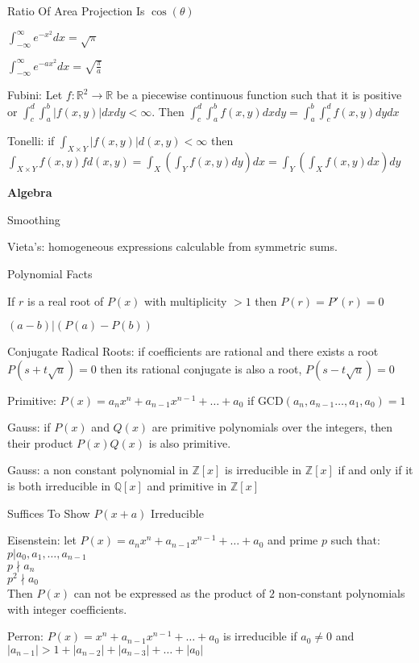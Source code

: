 Ratio Of Area Projection Is $\cos(\theta)$

$\int_{-\infty}^{\infty} e^{-x^2} dx = \sqrt{\pi}$

$\int_{-\infty}^{\infty} e^{-ax^2} dx = \sqrt{\frac{\pi}{a}}$

Fubini: Let $f: \mathbb{R}^2 \to \mathbb{R}$ be a piecewise continuous function such that it is positive or $\int_c^d \int_a^b |f(x,y)| dx dy < \infty$. Then $\int_c^d \int_a^b f(x,y) dx dy = \int_a^b \int_c^d f(x,y) dy dx$

Tonelli: if $\int_{X \times Y} |f(x,y)| d(x,y) < \infty$ then \\
$\int_{X \times Y} f(x,y)f d(x,y) = \int_{X}\left(\int_{Y} f(x,y) dy \right) dx = \int_{Y}\left(\int_{X} f(x,y) dx \right) dy$

\newpage

\textbf{Algebra}

Smoothing

Vieta's: homogeneous expressions calculable from symmetric sums.

Polynomial Facts

If $r$ is a real root of $P(x)$ with multiplicity $>1$ then $P(r)=P'(r)=0$

$(a-b)|(P(a)-P(b))$

Conjugate Radical Roots: if coefficients are rational and there exists a root $P(s+t\sqrt{u})=0$ then its rational conjugate is also a root, $P(s-t\sqrt{u})=0$

Primitive: $P(x)=a_n x^n+a_{n-1}x^{n-1}+\dots +a_0$ if $\text{GCD}(a_n,a_{n-1}\dots,a_1,a_0)=1$

Gauss: if $P(x)$ and $Q(x)$ are primitive polynomials over the integers, then their product $P(x)Q(x)$ is also primitive.

Gauss: a non constant polynomial in $\mathbb{Z}[x]$ is irreducible in $\mathbb{Z}[x]$ if and only if it is both irreducible in $\mathbb{Q}[x]$ and primitive in $\mathbb{Z}[x]$

Suffices To Show $P(x+a)$ Irreducible

Eisenstein: let $P(x)=a_n x^n+a_{n-1}x^{n-1}+\dots +a_0$ and prime $p$ such that: \\
$p | a_0,a_1,\dots,a_{n-1}$ \\
$p \nmid a_n$ \\
$p^2 \nmid a_0$ \\
Then $P(x)$ can not be expressed as the product of $2$ non-constant polynomials with integer coefficients.

Perron: $P(x)=x^n+a_{n-1}x^{n-1}+\dots +a_0$ is irreducible if $a_0 \neq 0$ and $|a_{n-1}| > 1 + |a_{n-2}| + |a_{n-3}| + \dots + |a_0|$

